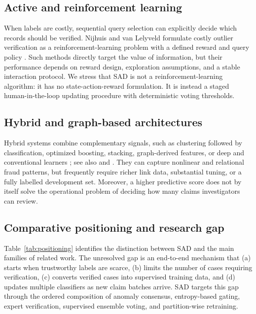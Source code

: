 \documentclass[12pt]{article}
\begin{document}
\subsection{Active and reinforcement learning}
When labels are costly, sequential query selection can explicitly decide which
records should be verified. Nijhuis and van Lelyveld formulate costly outlier
verification as a reinforcement-learning problem with a defined reward and
query policy \cite{A73}. Such methods directly target the value of information,
but their performance depends on reward design, exploration assumptions, and a
stable interaction protocol. We stress that SAD is not a reinforcement-learning
algorithm: it has no state-action-reward formulation. It is instead a staged
human-in-the-loop updating procedure with deterministic voting thresholds.

\subsection{Hybrid and graph-based architectures}
Hybrid systems combine complementary signals, such as clustering followed by
classification, optimized boosting, stacking, graph-derived features, or deep
and conventional learners \cite{A27}; see also \cite{Vorobyev2024} and
\cite{Ding2025}. They can capture nonlinear and relational fraud patterns,
but frequently require richer link data, substantial tuning, or a fully
labelled development set. Moreover, a higher predictive score does not by
itself solve the operational problem of deciding how many claims investigators
can review.

\subsection{Comparative positioning and research gap}
Table~\ref{tab:positioning} identifies the distinction between SAD and the main
families of related work. The unresolved gap is an end-to-end mechanism that
(a) starts when trustworthy labels are scarce, (b) limits the number of cases
requiring verification, (c) converts verified cases into supervised training
data, and (d) updates multiple classifiers as new claim batches arrive. SAD
targets this gap through the ordered composition of anomaly consensus,
entropy-based gating, expert verification, supervised ensemble voting, and
partition-wise retraining.
\end{document}
